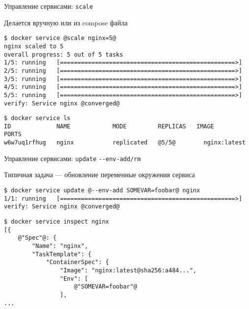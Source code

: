 \begin{frame}[fragile]{Управление сервисами: \texttt{scale}}

Делается вручную или из compose файла

\begin{tcolorbox-code}
\begin{lstlisting}[style=base]
$ docker service @scale nginx=5@
nginx scaled to 5
overall progress: 5 out of 5 tasks 
1/5: running   [==================================================>] 
2/5: running   [==================================================>] 
3/5: running   [==================================================>] 
4/5: running   [==================================================>] 
5/5: running   [==================================================>] 
verify: Service nginx @converged@
\end{lstlisting}
\end{tcolorbox-code}

\begin{tcolorbox-code}
\begin{lstlisting}[style=base]
$ docker service ls
ID             NAME            MODE         REPLICAS   IMAGE          PORTS
w6w7uq1rfhug   nginx           replicated   @5/5@        nginx:latest   
\end{lstlisting}
\end{tcolorbox-code}


\end{frame}



\begin{frame}[fragile]{Управление сервисами: \texttt{update} \texttt{-{}-env-add/rm} }

Типичная задача --- обновление переменные окружения сервиса

\begin{tcolorbox-code}
\begin{lstlisting}[style=base]
$ docker service update @--env-add SOMEVAR=foobar@ nginx
1/1: running   [==================================================>] 
verify: Service nginx @converged@
\end{lstlisting}
\end{tcolorbox-code}

\begin{tcolorbox-code}
\begin{lstlisting}[style=base]
$ docker service inspect nginx
[{
    @"Spec"@: {
        "Name": "nginx",
        "TaskTemplate": {
            "ContainerSpec": {
                "Image": "nginx:latest@sha256:a484...",
                "Env": [
                    @"SOMEVAR=foobar"@
                ],
...
\end{lstlisting}
\end{tcolorbox-code}

\end{frame}

